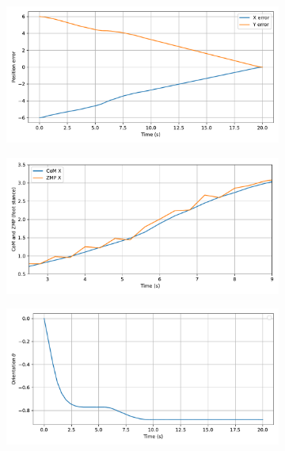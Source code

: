 \begin{figure}[H]
    \centering
    \begin{subfigure}{0.45\linewidth}
        \centering
        \includegraphics[width=\linewidth]{figures/Simulations/sim1circles/evolution_0.pdf}
    \end{subfigure}
    \begin{subfigure}{0.45\linewidth}
        \centering
        \includegraphics[width=\linewidth]{figures/Simulations/sim1circles/evolution_4.pdf}
    \end{subfigure}
    \hfill
    \begin{subfigure}{0.45\linewidth}
        \centering
        \includegraphics[width=\linewidth]{figures/Simulations/sim1circles/evolution_2.pdf}

\end{subfigure}
\end{figure}
